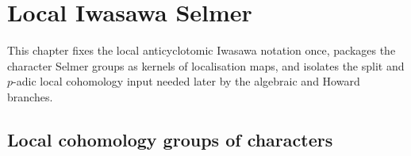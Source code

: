\chapter{Local Iwasawa Selmer}
\label{chap:local-iwasawa-selmer}


This chapter fixes the local anticyclotomic Iwasawa notation once, packages the character Selmer groups as kernels of localisation maps, and isolates the split and \(p\)-adic local cohomology input needed later by the algebraic and Howard branches.

\section{Local cohomology groups of characters}

